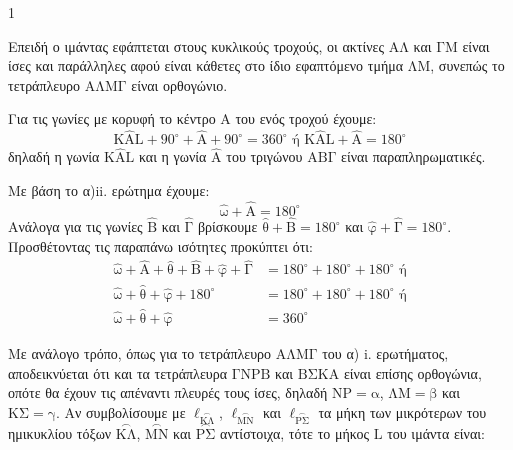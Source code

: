 \begin{ylh}{1}
    \item [Λύση]
\end{ylh}
\begin{alist}
\item
    \begin{rlist}
    \item Επειδή ο ιμάντας εφάπτεται στους κυκλικούς τροχούς, οι ακτίνες $\mathrm{A\Lambda}$ και $\mathrm{\Gamma M}$ είναι ίσες και παράλληλες αφού είναι κάθετες στο ίδιο εφαπτόμενο τμήμα $\mathrm{\Lambda M}$, συνεπώς το τετράπλευρο $\mathrm{A\Lambda M\Gamma}$ είναι ορθογώνιο.
    \item Για τις γωνίες με κορυφή το κέντρο $\mathrm{A}$ του ενός τροχού έχουμε:
    \[ \mathrm{K\widehat{A}L} + 90^{\circ} + \mathrm{\widehat{A}} + 90^{\circ} = 360^{\circ} \text{ ή } \mathrm{K\widehat{A}L} + \mathrm{\widehat{A}} = 180^{\circ} \]
    δηλαδή η γωνία $\mathrm{K\widehat{A}L}$ και η γωνία $\mathrm{\widehat{A}}$ του τριγώνου $\mathrm{AB\Gamma}$ είναι παραπληρωματικές.
    \end{rlist}
\item Με βάση το α)ii. ερώτημα έχουμε:
    \[ \mathrm{\widehat{\omega}} + \mathrm{\widehat{A}} = 180^{\circ} \]
    Ανάλογα για τις γωνίες $\mathrm{\widehat{B}}$ και $\mathrm{\widehat{\Gamma}}$ βρίσκουμε $\mathrm{\widehat{\theta}} + \mathrm{\widehat{B}} = 180^{\circ}$ και $\mathrm{\widehat{\varphi}} + \mathrm{\widehat{\Gamma}} = 180^{\circ}$.
    Προσθέτοντας τις παραπάνω ισότητες προκύπτει ότι:
    \begin{align*}
        \mathrm{\widehat{\omega}} + \mathrm{\widehat{A}} + \mathrm{\widehat{\theta}} + \mathrm{\widehat{B}} + \mathrm{\widehat{\varphi}} + \mathrm{\widehat{\Gamma}} &= 180^{\circ} + 180^{\circ} + 180^{\circ} \text{ ή} \\
        \mathrm{\widehat{\omega}} + \mathrm{\widehat{\theta}} + \mathrm{\widehat{\varphi}} + 180^{\circ} &= 180^{\circ} + 180^{\circ} + 180^{\circ} \text{ ή} \\
        \mathrm{\widehat{\omega}} + \mathrm{\widehat{\theta}} + \mathrm{\widehat{\varphi}} &= 360^{\circ}
    \end{align*}
\item Με ανάλογο τρόπο, όπως για το τετράπλευρο $\mathrm{A\Lambda M\Gamma}$ του α) i. ερωτήματος, αποδεικνύεται ότι και τα τετράπλευρα $\mathrm{\Gamma NPB}$ και $\mathrm{B\Sigma KA}$ είναι επίσης ορθογώνια, οπότε θα έχουν τις απέναντι πλευρές τους ίσες, δηλαδή $\mathrm{NP} = \mathrm{\alpha}$, $\mathrm{\Lambda M} = \mathrm{\beta}$ και $\mathrm{K\Sigma} = \mathrm{\gamma}$. Αν συμβολίσουμε με $\ell_{\overset{\frown}{\mathrm{K\Lambda}}}$, $\ell_{\overset{\frown}{\mathrm{MN}}}$ και $\ell_{\overset{\frown}{\mathrm{P\Sigma}}}$ τα μήκη των μικρότερων του ημικυκλίου τόξων $\overset{\frown}{\mathrm{K\Lambda}}$, $\overset{\frown}{\mathrm{MN}}$ και $\overset{\frown}{\mathrm{P\Sigma}}$ αντίστοιχα, τότε το μήκος $\mathrm{L}$ του ιμάντα είναι:

\end{alist}
